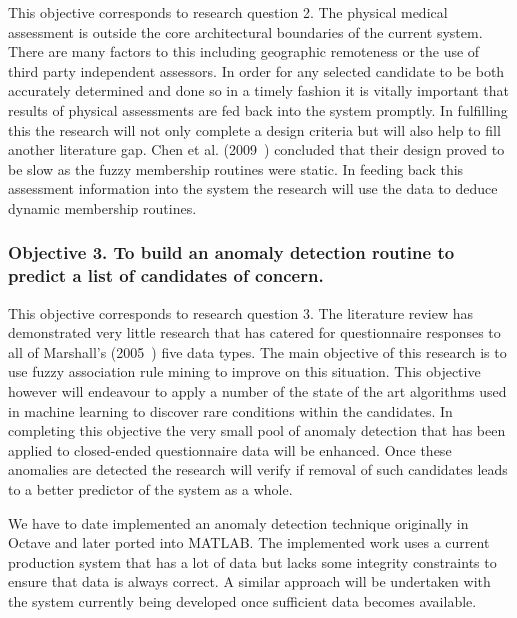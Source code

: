 This objective corresponds to research question 2. The physical medical assessment is outside the core architectural boundaries of the current system. There are many factors to this including geographic remoteness or the use of third party independent assessors. In order for any selected candidate to be both accurately determined and done so in a timely fashion it is vitally important that results of physical assessments are fed back into the system promptly. In fulfilling this the research will not only complete a design criteria but will also help to fill another literature gap. Chen et al. (2009~\cite{chen2009mining}) concluded that their design proved to be slow as the fuzzy membership routines were static. In feeding back this assessment information into the system the research will use the data to deduce dynamic membership routines.


\subsubsection{Objective 3. To build an anomaly detection routine to predict a list of candidates of concern.}

This objective corresponds to research question 3. The literature review has demonstrated very little research that has catered for questionnaire responses to all of Marshall's (2005~\cite{marshall2005purpose}) five data types. The main objective of this research is to use fuzzy association rule mining to improve on this situation. This objective however will endeavour to apply a number of the state of the art algorithms used in machine learning to discover rare conditions within the candidates. In completing this objective the very small pool of anomaly detection that has been applied to closed-ended questionnaire data will be enhanced. Once these anomalies are detected the research will verify if removal of such candidates leads to a better predictor of the system as a whole.


We have to date implemented an anomaly detection technique originally in Octave and later ported into MATLAB. The implemented work uses a current production system that has a lot of data but lacks some integrity constraints to ensure that data is always correct.
A similar approach will be undertaken with the system currently being developed once sufficient data becomes available.

